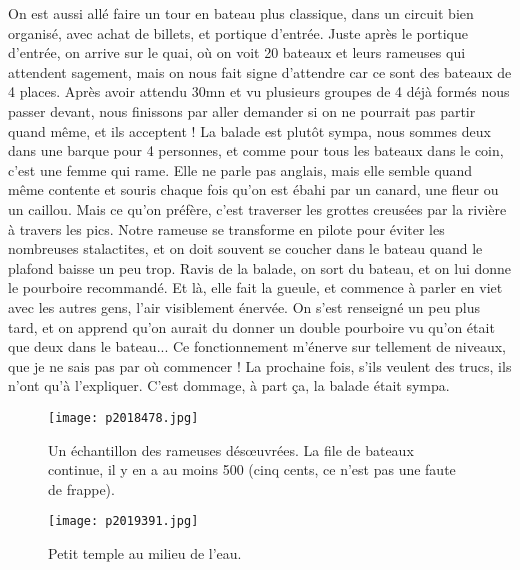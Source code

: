 \documentclass{book}
\begin{document}
On est aussi allé faire un tour en bateau plus classique, dans un circuit bien organisé, avec achat de billets, et portique d'entrée. Juste après le portique d'entrée, on arrive sur le quai, où on voit 20 bateaux et leurs rameuses qui attendent sagement, mais on nous fait signe d'attendre car ce sont des bateaux de 4 places. Après avoir attendu 30mn et vu plusieurs groupes de 4 déjà formés nous passer devant, nous finissons par aller demander si on ne pourrait pas partir quand même, et ils acceptent ! La balade est plutôt sympa, nous sommes deux dans une barque pour 4 personnes, et comme pour tous les bateaux dans le coin, c'est une femme qui rame. Elle ne parle pas anglais, mais elle semble quand même contente et souris chaque fois qu'on est ébahi par un canard, une fleur ou un caillou. Mais ce qu'on préfère, c'est traverser les grottes creusées par la rivière à travers les pics. Notre rameuse se transforme en pilote pour éviter les nombreuses stalactites, et on doit souvent se coucher dans le bateau quand le plafond baisse un peu trop. Ravis de la balade, on sort du bateau, et on lui donne le pourboire recommandé. Et là, elle fait la gueule, et commence à parler en viet avec les autres gens, l'air visiblement énervée. On s'est renseigné un peu plus tard, et on apprend qu'on aurait du donner un double pourboire vu qu'on était que deux dans le bateau... Ce fonctionnement m'énerve sur tellement de niveaux, que je ne sais pas par où commencer ! La prochaine fois, s'ils veulent des trucs, ils n'ont qu'à l'expliquer. C'est dommage, à part ça, la balade était sympa.


\begin{figure}[h]
\centering
\texttt{[image: p2018478.jpg]}
\caption*{Un échantillon des rameuses désœuvrées. La file de bateaux continue, il y en a au moins 500 (cinq cents, ce n'est pas une faute de frappe).}
\end{figure}


\begin{figure}[h]
\centering
\texttt{[image: p2019391.jpg]}
\caption*{Petit temple au milieu de l'eau.}
\end{figure}
\end{document}
